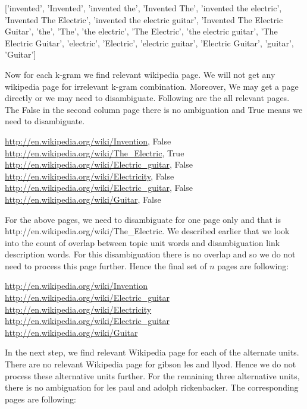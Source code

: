 \documentclass[11pt]{article}
\begin{document}
['invented', 'Invented', 'invented the', 'Invented The', 'invented the electric', 'Invented The Electric', 'invented the electric guitar', 'Invented The Electric Guitar', 'the', 'The', 'the electric', 'The Electric', 'the electric guitar', 'The Electric Guitar', 'electric', 'Electric', 'electric guitar', 'Electric Guitar', 'guitar', 'Guitar'] 

Now for each k-gram we find relevant wikipedia page. We will not get any wikipedia page for irrelevant k-gram combination.  Moreover, We may get a page directly or we may need to disambiguate. Following are the all relevant pages. The False in the second column page there is no ambiguation and True means we need to disambiguate.

\url{http://en.wikipedia.org/wiki/Invention}, False\\
\url{http://en.wikipedia.org/wiki/The_Electric}, True \\
\url{http://en.wikipedia.org/wiki/Electric_guitar}, False\\
\url{http://en.wikipedia.org/wiki/Electricity}, False \\
\url{http://en.wikipedia.org/wiki/Electric_guitar}, False \\
\url{http://en.wikipedia.org/wiki/Guitar}, False

For the above pages, we need to disambiguate for one page only and that is http://en.wikipedia.org/wiki/The\_Electric. We described earlier that we look into the count of overlap between topic unit words and disambiguation link description words. For this disambiguation there is no overlap and so we do not need to process this page further. Hence the final set of $n$ pages are following:

\url{http://en.wikipedia.org/wiki/Invention} \\
\url{http://en.wikipedia.org/wiki/Electric_guitar} \\
\url{http://en.wikipedia.org/wiki/Electricity} \\
\url{http://en.wikipedia.org/wiki/Electric_guitar} \\
\url{http://en.wikipedia.org/wiki/Guitar}

In the next step, we find relevant Wikipedia page for each of the alternate units. There are no relevant Wikipedia page for  gibson les and llyod. Hence we do not process these alternative units further. For the remaining three alternative units, there is no ambiguation for les paul and adolph rickenbacker. The corresponding pages are following:
\end{document}
